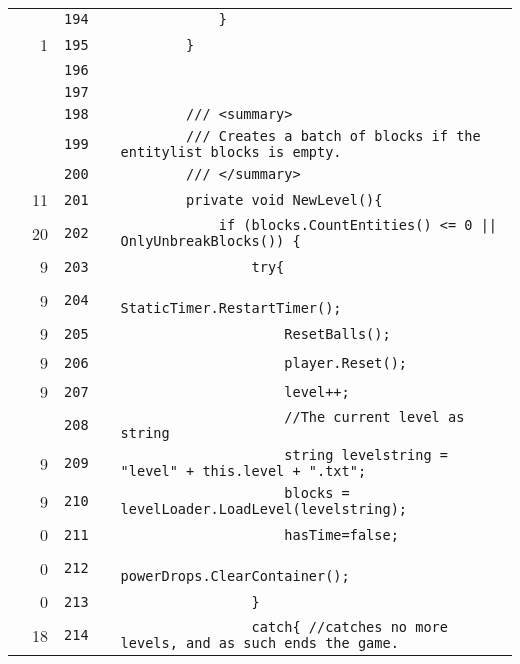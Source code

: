 \documentclass[a4paper,landscape,10pt]{article}
\begin{document}
\begin{longtable}[l]{lrrll}
\cellcolor{gray} &  & \verb~194~ & & \verb~            }~\\
\cellcolor{green} & 1 & \verb~195~ & & \verb~        }~\\
\cellcolor{gray} &  & \verb~196~ & & \verb~~\\
\cellcolor{gray} &  & \verb~197~ & & \verb~~\\
\cellcolor{gray} &  & \verb~198~ & & \verb~        /// <summary>~\\
\cellcolor{gray} &  & \verb~199~ & & \verb~        /// Creates a batch of blocks if the entitylist blocks is empty.~\\
\cellcolor{gray} &  & \verb~200~ & & \verb~        /// </summary>~\\
\cellcolor{green} & 11 & \verb~201~ & & \verb~        private void NewLevel(){~\\
\cellcolor{green} & 20 & \verb~202~ & & \verb~            if (blocks.CountEntities() <= 0 || OnlyUnbreakBlocks()) {~\\
\cellcolor{green} & 9 & \verb~203~ & & \verb~                try{~\\
\cellcolor{green} & 9 & \verb~204~ & & \verb~                    StaticTimer.RestartTimer();~\\
\cellcolor{green} & 9 & \verb~205~ & & \verb~                    ResetBalls();~\\
\cellcolor{green} & 9 & \verb~206~ & & \verb~                    player.Reset();~\\
\cellcolor{green} & 9 & \verb~207~ & & \verb~                    level++;~\\
\cellcolor{gray} &  & \verb~208~ & & \verb~                    //The current level as string~\\
\cellcolor{green} & 9 & \verb~209~ & & \verb~                    string levelstring = "level" + this.level + ".txt";~\\
\cellcolor{green} & 9 & \verb~210~ & & \verb~                    blocks = levelLoader.LoadLevel(levelstring);~\\
\cellcolor{red} & 0 & \verb~211~ & & \verb~                    hasTime=false;~\\
\cellcolor{red} & 0 & \verb~212~ & & \verb~                    powerDrops.ClearContainer();~\\
\cellcolor{red} & 0 & \verb~213~ & & \verb~                }~\\
\cellcolor{green} & 18 & \verb~214~ & & \verb~                catch{ //catches no more levels, and as such ends the game.~\\

\end{longtable}
\end{document}
